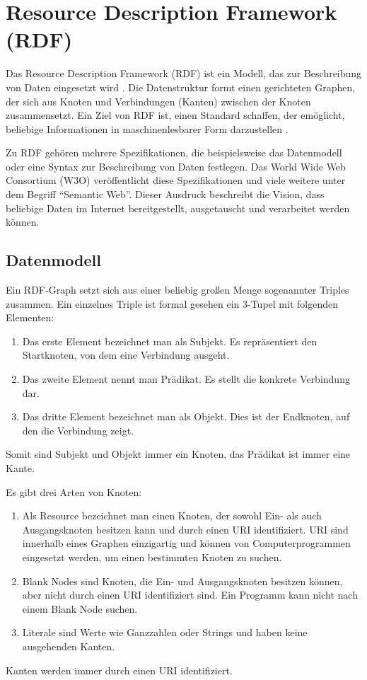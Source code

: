 \section{Resource Description Framework (RDF)}

Das Resource Description Framework (RDF) ist ein Modell, das zur Beschreibung von Daten eingesetzt wird \cite[vgl.][]{w3c2014rdf}. Die Datenstruktur formt einen gerichteten Graphen, der sich aus Knoten und Verbindungen (Kanten) zwischen der Knoten zusammensetzt. Ein Ziel von RDF ist, einen Standard schaffen, der emöglicht, beliebige Informationen in maschinenlesbarer Form darzustellen \cite[vgl.][Sektion 2]{w3c2014rdfprimer}.

Zu RDF gehören mehrere Spezifikationen, die beispielsweise das Datenmodell oder eine Syntax zur Beschreibung von Daten festlegen. Das World Wide Web Consortium (W3O) veröffentlicht diese Spezifikationen und viele weitere unter dem Begriff "`Semantic Web"'. Dieser Ausdruck beschreibt die Vision, dass beliebige Daten im Internet bereitgestellt, ausgetauscht und verarbeitet werden können. \cite[vgl.][]{w3c2014semanticweb}

\subsection{Datenmodell}

Ein RDF-Graph setzt sich aus einer beliebig großen Menge sogenannter Triples zusammen. \cite[vgl.][Sektion 3.1]{w3c2014rdfconcepts} Ein einzelnes Triple ist formal gesehen ein 3-Tupel mit folgenden Elementen:
\begin{enumerate}
	\item Das erste Element bezeichnet man als Subjekt. Es repräsentiert den Startknoten, von dem eine Verbindung ausgeht.
	\item Das zweite Element nennt man Prädikat. Es stellt die konkrete Verbindung dar.
	\item Das dritte Element bezeichnet man als Objekt. Dies ist der Endknoten, auf den die Verbindung zeigt. 
\end{enumerate}

Somit sind Subjekt und Objekt immer ein Knoten, das Prädikat ist immer eine Kante.

Es gibt drei Arten von Knoten:
\begin{enumerate}
	\item Als Resource bezeichnet man einen Knoten, der sowohl Ein- als auch Ausgangsknoten besitzen kann und durch einen URI identifiziert. URI sind innerhalb eines Graphen einzigartig und können von Computerprogrammen eingesetzt werden, um einen bestimmten Knoten zu suchen.
	\item Blank Nodes sind Knoten, die Ein- und Ausgangsknoten besitzen können, aber nicht durch einen URI identifiziert sind. Ein Programm kann nicht nach einem Blank Node suchen.
	\item Literale sind Werte wie Ganzzahlen oder Strings und haben keine ausgehenden Kanten.	
\end{enumerate}
Kanten werden immer durch einen URI identifiziert.


